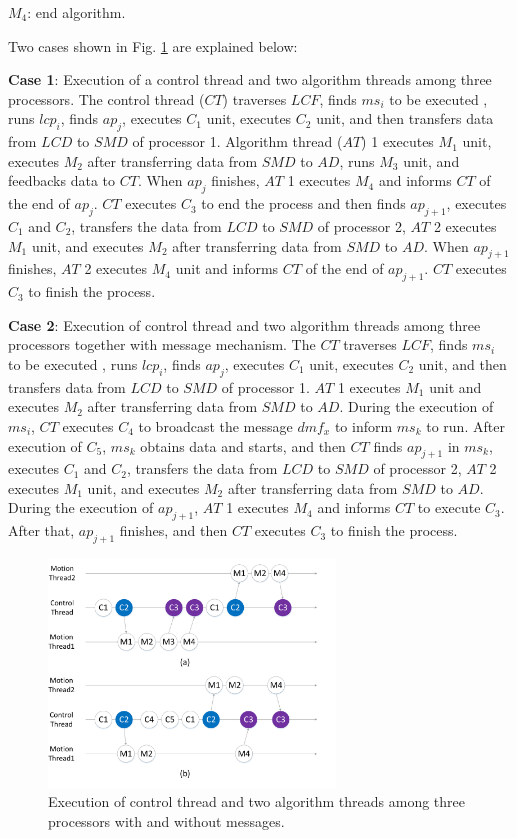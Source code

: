 \documentclass[journal,UTF8]{IEEEtran}
\begin{document}
	\textbf{$M_{4}$}: end algorithm.
	
	Two cases shown in Fig. \ref{fig:threadFlow} are explained below:
	
	\textbf{Case 1}: Execution of a control thread and two algorithm threads among three processors. The control thread ($CT$) traverses $LCF$, finds $ms_i$ to be executed , runs $lcp_i$, finds $ap_j$, executes $C_1$ unit, executes $C_2$ unit, and then transfers data from $LCD$ to $SMD$ of processor 1. Algorithm thread ($AT$) 1 executes $M_1$ unit, executes $M_2$ after transferring data from $SMD$ to $AD$, runs $M_3$ unit, and feedbacks data to $CT$. When $ap_j$ finishes, $AT$ 1 executes $M_4$ and informs $CT$ of the end of $ap_j$. $CT$ executes $C_3$ to end the process and then finds $ap_{j+1}$, executes $C_1$ and $C_2$, transfers the data from $LCD$ to $SMD$ of processor 2, $AT$ 2 executes $M_1$ unit, and executes $M_2$ after transferring data from $SMD$ to $AD$. When $ap_{j+1}$ finishes, $AT$ 2 executes $M_4$ unit and informs $CT$ of the end of $ap_{j+1}$. $CT$ executes $C_3$ to finish the process.
	
	\textbf{Case 2}: Execution of control thread and two algorithm threads among three processors together with message mechanism. The $CT$ traverses $LCF$, finds $ms_i$ to be executed , runs $lcp_i$, finds $ap_j$, executes $C_1$ unit, executes $C_2$ unit, and then transfers data from $LCD$ to $SMD$ of processor 1. $AT$ 1 executes $M_1$ unit and executes $M_2$ after transferring data from $SMD$ to $AD$. During the execution of $ms_i$, $CT$ executes $C_4$ to broadcast the message $dmf_x$ to inform $ms_{k}$ to run. After execution of $C_5$, $ms_{k}$ obtains data and starts, and then $CT$ finds $ap_{j+1}$ in $ms_{k}$, executes $C_1$ and $C_2$, transfers the data from $LCD$ to $SMD$ of processor 2, $AT$ 2 executes $M_1$ unit, and executes $M_2$ after transferring data from $SMD$ to $AD$. During the execution of $ap_{j+1}$, $AT$ 1 executes $M_4$ and informs $CT$ to execute $C_3$. After that, $ap_{j+1}$ finishes, and then $CT$ executes $C_3$ to finish the process.
	
	
	
	\begin{figure}
		\centering
		\includegraphics[width=3in]{fig/threadFlow.pdf}
		\caption{ Execution of control thread and two algorithm threads among three processors with and without messages.}
		\label{fig:threadFlow}
	\end{figure}
\end{document}
